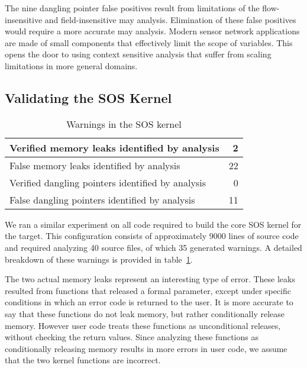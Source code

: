 \smallskip{}

The nine dangling pointer false positives result from limitations of
the flow-insensitive and field-insensitive may analysis.  Elimination
of these false positives would require a more accurate may analysis.
Modern sensor network applications are made of small components that
effectively limit the scope of variables.  This opens the door to using
context sensitive analysis that suffer from scaling limitations in
more general domains.


\subsection{Validating the SOS Kernel}

\begin{table}
\caption{Warnings in the SOS kernel}
%
\label{tab:kernel}
\centering 
\begin{tabular}{| l | r |}
    \hline 
    Verified memory leaks identified by analysis & 2 \\
    \hline
    False memory leaks identified by analysis & 22 \\
    \hline 
    Verified dangling pointers identified by analysis & 0 \\
    \hline 
    False dangling pointers identified by analysis & 11 \\
    \hline 
\end{tabular} 
%
\end{table}


We ran a similar experiment on all code required to build the core 
SOS kernel for the  target.  This configuration consists
of approximately 9000 lines of source code and required analyzing 40
source files, of which 35 generated warnings.  A detailed breakdown of
these warnings is provided in table~\ref{tab:kernel}.

The two actual memory leaks represent an interesting type of error.
These leaks resulted from functions that released a formal parameter,
except 
%
%
under specific conditions in which 
%
an error code is returned to the user.
%
It is more accurate to say that these functions do not leak
memory, but rather conditionally release memory.  However user code
treats these functions as unconditional releases, without checking
the return values.  Since analyzing these functions as conditionally 
releasing memory 
results in more errors in user code,
we assume that the two kernel functions are incorrect.

